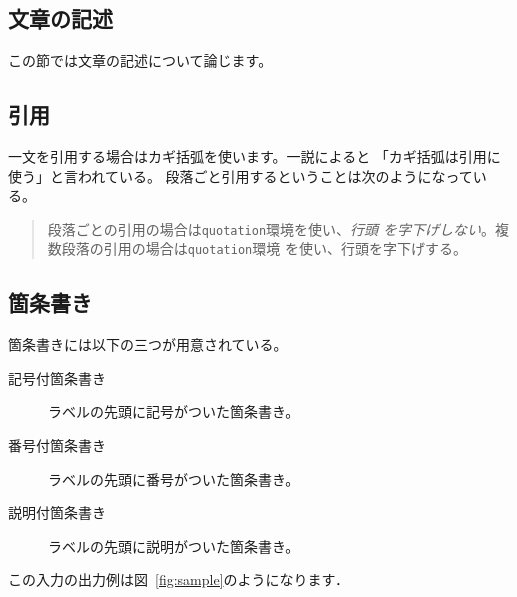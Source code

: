 {\begin{Prob}
\begin{InText}
\section{文章の記述}
この節では文章の記述について論じます。
\subsection{引用}
一文を引用する場合はカギ括弧を使います。一説によると
「カギ括弧は引用に使う」と言われている。
段落ごと引用するということは次のようになっている。
\begin{quote}
段落ごとの引用の場合は\verb|quotation|環境を使い、\emph{行頭
を字下げしない}。複数段落の引用の場合は\verb|quotation|環境
を使い、行頭を字下げする。
\end{quote}
\subsection{箇条書き}
箇条書きには以下の三つが用意されている。
\begin{description}
 \item[記号付箇条書き] ラベルの先頭に記号がついた箇条書き。
 \item[番号付箇条書き] ラベルの先頭に番号がついた箇条書き。
 \item[説明付箇条書き] ラベルの先頭に説明がついた箇条書き。
\end{description}
	
\end{InText}

この入力の出力例は図~\ref{fig:sample}のようになります．


\end{Prob}}
